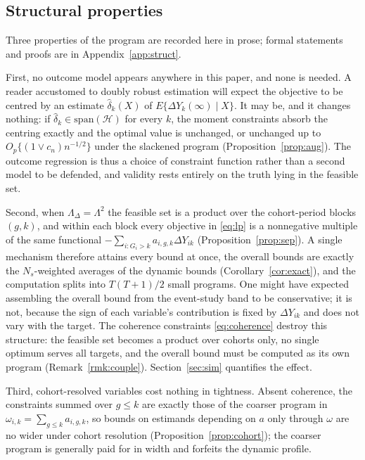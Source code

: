 \documentclass[12pt]{article}
\theoremstyle{remark}
\begin{document}
\subsection{Structural properties}
\label{sec:props}

Three properties of the program are recorded here in prose; formal statements and proofs
are in Appendix~\ref{app:struct}.

First, no outcome model appears anywhere in this paper, and none is needed. A reader
accustomed to doubly robust estimation will expect the objective to be centred by an
estimate $\widehat\delta_k(X)$ of $E\{\Delta Y_k(\infty) \mid X\}$. It may be, and it
changes nothing: if $\widehat\delta_k \in \mathrm{span}(\mathcal{H})$ for every $k$, the
moment constraints absorb the centring exactly and the optimal value is unchanged, or
unchanged up to $O_p\{(1 \vee c_n) n^{-1/2}\}$ under the slackened program
(Proposition~\ref{prop:aug}). The outcome regression is thus a choice of constraint
function rather than a second model to be defended, and validity rests entirely on the
truth lying in the feasible set.

Second, when $\Lambda_\Delta = \Lambda^2$ the feasible set is a product over the
cohort-period blocks $(g,k)$, and within each block every objective in \eqref{eq:lp} is a
nonnegative multiple of the same functional $-\sum_{i : G_i > k} a_{i,g,k}\Delta Y_{ik}$
(Proposition~\ref{prop:sep}). A single mechanism therefore attains every bound at once, the
overall bounds are exactly the $N_s$-weighted averages of the dynamic bounds
(Corollary~\ref{cor:exact}), and the computation splits into $T(T{+}1)/2$ small programs.
One might have expected assembling the overall bound from the event-study band to be
conservative; it is not, because the sign of each variable's contribution is fixed by
$\Delta Y_{ik}$ and does not vary with the target. The coherence constraints
\eqref{eq:coherence} destroy this structure: the feasible set becomes a product over
cohorts only, no single optimum serves all targets, and the overall bound must be computed
as its own program (Remark~\ref{rmk:couple}). Section~\ref{sec:sim} quantifies the effect.

Third, cohort-resolved variables cost nothing in tightness. Absent coherence, the
constraints summed over $g \le k$ are exactly those of the coarser program in
$\omega_{i,k} = \sum_{g \le k} a_{i,g,k}$, so bounds on estimands depending on $a$ only
through $\omega$ are no wider under cohort resolution (Proposition~\ref{prop:cohort}); the
coarser program is generally paid for in width and forfeits the dynamic profile.
\end{document}
